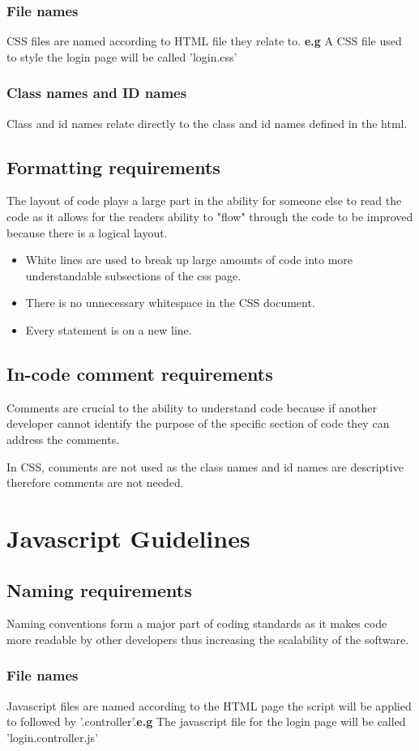 \documentclass[11pt]{article}
\begin{document}
	\subsubsection{File names}
	CSS files are named according to HTML file they relate to. \textbf{e.g} A CSS file used to style the login page will be called 'login.css'
	\subsubsection{Class names and ID names}
	Class and id names relate directly to the class and id names defined in the html.
	\subsection{Formatting requirements}
	The layout of code plays a large part in the ability for someone else to read the code as it allows for the readers ability to "flow" through the code to be improved because there is a logical layout.
	\begin{itemize}
		\item White lines are used to break up large amounts of code into more understandable subsections of the css page.
		\item There is no unnecessary whitespace in the CSS document.
		\item Every statement is on a new line.
	\end{itemize}
	\subsection{In-code comment requirements}
	Comments are crucial to the ability to understand code because if another developer cannot identify the purpose of the specific section of code they can address the comments.
	
	In CSS, comments are not used as the class names and id names are descriptive therefore comments are not needed.
	
	\section{Javascript Guidelines}
	\subsection{Naming requirements}
	Naming conventions form a major part of coding standards as it makes code more readable by other developers thus increasing the scalability of the software.
	\subsubsection{File names}
	Javascript files are named according to the HTML page the script will be applied to followed by '.controller'.\textbf{e.g} The javascript file for the login page will be called 'login.controller.js'
	
\end{document}
